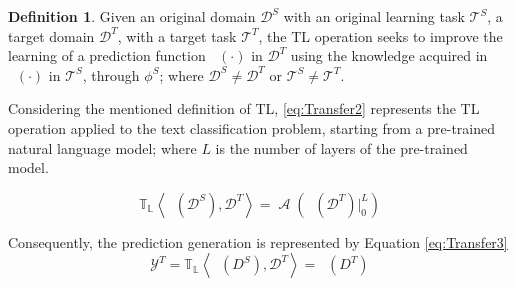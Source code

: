 \documentclass[onecolumn, journal, english, 12pt, a4paper]{IEEEtran} %
\DeclareMathOperator{\ypredtarget}{\phi^{T}}
\DeclareMathOperator{\ypredsource}{\phi^{S}}
\DeclareMathOperator{\ConvNetOut}{\mathcal{A}}
\theoremstyle{definition}
\newtheorem{definition}{Definition}[section]
\begin{document}
\begin{definition}
  Given an original domain $\mathcal{D}^{S}$ with an original learning
  task $\mathcal{T}^{S}$, a target domain $\mathcal{D}^{T}$, with a
  target task $\mathcal{T}^{T}$, the TL operation seeks to improve the
  learning of a prediction function $\ypredtarget(\cdot)$ in
  $\mathcal{D}^{T}$ using the knowledge acquired in
  $\ypredsource(\cdot)$ in $\mathcal{T}^{S}$, through $\phi^S$; where
  $\mathcal{D}^{S} \neq \mathcal{D}^{T}$ or
  $\mathcal{T}^{S} \neq \mathcal{T}^{T}$.
\end{definition}

Considering the mentioned definition of TL, \eqref{eq:Transfer2}
represents the TL operation applied to the text classification
problem, starting from a pre-trained natural language model; where $L$
is the number of layers of the pre-trained model.

\begin{equation}
  \mathbb{T_{L}} \left< \ypredsource(\mathcal{D}^{S}), \mathcal{D}^{T}  \right> = \ConvNetOut \left(\ypredsource(\mathcal{D}^{T}) \Bigr\rvert_{0}^{L} \right)
    \label{eq:Transfer2}
\end{equation}

Consequently, the prediction generation is represented by Equation
\eqref{eq:Transfer3}
\begin{equation}
    \mathcal{Y}^{T} = \mathbb{T_{L}} \left< \ypredsource(D^{S}), \mathcal{D}^{T} \right> = \ypredtarget(D^T) 
    \label{eq:Transfer3}
\end{equation}
\end{document}
